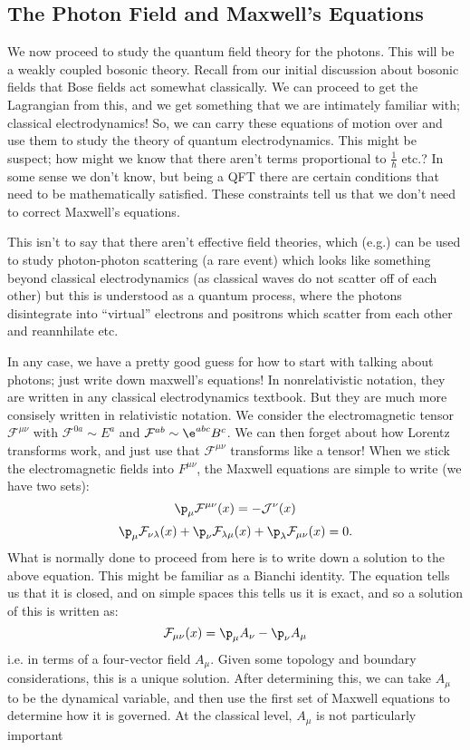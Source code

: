 \subsection{The Photon Field and Maxwell's Equations}
We now proceed to study the quantum field theory for the photons. This will be a weakly coupled bosonic theory. Recall from our initial discussion about bosonic fields that Bose fields act somewhat classically. We can proceed to get the Lagrangian from this, and we get something that we are intimately familiar with; classical electrodynamics! So, we can carry these equations of motion over and use them to study the theory of quantum electrodynamics. This might be suspect; how might we know that there aren't terms proportional to $\frac{1}{\hbar}$ etc.? In some sense we don't know, but being a QFT there are certain conditions that need to be mathematically satisfied. These constraints tell us that we don't need to correct Maxwell's equations.

This isn't to say that there aren't effective field theories, which (e.g.) can be used to study photon-photon scattering (a rare event) which looks like something beyond classical electrodynamics (as classical waves do not scatter off of each other) but this is understood as a quantum process, where the photons disintegrate into ``virtual'' electrons and positrons which scatter from each other and reannhilate etc.

In any case, we have a pretty good guess for how to start with talking about photons; just write down maxwell's equations! In nonrelativistic notation, they are written in any classical electrodynamics textbook. But they are much more consisely written in relativistic notation. We consider the electromagnetic tensor $\mathcal{F}^{\mu\nu}$ with $\mathcal{F}^{0a} \sim E^a$ and $\mathcal{F}^{ab} \sim \e^{abc}B^c$. We can then forget about how Lorentz transforms work, and just use that $\mathcal{F}^{\mu\nu}$ transforms like a tensor! When we stick the electromagnetic fields into $F^{\mu\nu}$, the Maxwell equations are simple to write (we have two sets):
\begin{equation}
    \p_\mu \mathcal{F}^{\mu\nu}(x) = -\mathcal{J}^\nu(x)
\end{equation}
\begin{equation}
    \p_\mu \mathcal{F}_{\nu\lambda}(x) + \p_\nu \mathcal{F}_{\lambda \mu}(x) + \p_\lambda \mathcal{F}_{\mu\nu}(x) = 0.
\end{equation}
What is normally done to proceed from here is to write down a solution to the above equation. This might be familiar as a Bianchi identity. The equation tells us that it is closed, and on simple spaces this tells us it is exact, and so a solution of this is written as:
\begin{equation}
    \mathcal{F}_{\mu\nu}(x) = \p_\mu A_\nu - \p_\nu A_\mu
\end{equation}
i.e. in terms of a four-vector field $A_\mu$. Given some topology and boundary considerations, this is a unique solution. After determining this, we can take $A_\mu$ to be the dynamical variable, and then use the first set of Maxwell equations to determine how it is governed. At the classical level, $A_\mu$ is not particularly important 